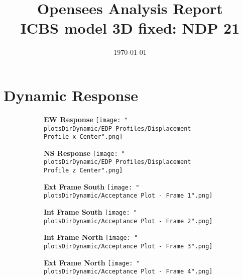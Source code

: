 \documentclass[12pt]{article} %
\newcommand{\modelName}{ICBS_model_3D_fixed}
\newcommand{\analysisName}{NDP_21}
\newcommand{\plotsDirDynamic}{outputs/\modelName/\analysisName/analysis_plots}
\begin{document}
	\title{Opensees Analysis Report\\
	\Large ICBS model 3D fixed: NDP 21}
	\date{\today}
	\maketitle
	
	
	\section{Dynamic Response}
	
		\begin{figure}[h]
			\centering
			\begin{subfigure}{.49\textwidth}
				\centering
				\textbf{EW Response}
				\texttt{[image: "\\plotsDirDynamic/EDP Profiles/Displacement Profile x Center".png]}
			\end{subfigure}
			\begin{subfigure}{.49\textwidth}
				\centering
				\textbf{NS Response}
				\texttt{[image: "\\plotsDirDynamic/EDP Profiles/Displacement Profile z Center".png]}
			\end{subfigure}
		\end{figure}
		\pagebreak
		
		\begin{figure}[h]
			\centering
			\begin{subfigure}{.49\textwidth}
				\centering
				\textbf{Ext Frame South}
				\texttt{[image: "\\plotsDirDynamic/Acceptance Plot - Frame 1".png]}
			\end{subfigure}
			\begin{subfigure}{.49\textwidth}
				\centering
				\textbf{Int Frame South}
				\texttt{[image: "\\plotsDirDynamic/Acceptance Plot - Frame 2".png]}
			\end{subfigure}
		\end{figure}
		\begin{figure}[h]
			\centering
			\begin{subfigure}{.49\textwidth}
				\centering
				\textbf{Int Frame North}
				\texttt{[image: "\\plotsDirDynamic/Acceptance Plot - Frame 3".png]}
			\end{subfigure}
			\begin{subfigure}{.49\textwidth}
				\centering
				\textbf{Ext Frame North}
				\texttt{[image: "\\plotsDirDynamic/Acceptance Plot - Frame 4".png]}
			\end{subfigure}
		\end{figure}
		\pagebreak
	
\end{document}
